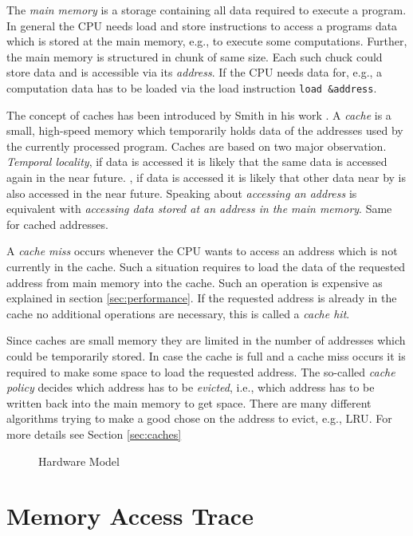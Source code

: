 \documentclass[onecolumn, openany, master, english, seal, signatures]{dbrgrptt}
\begin{document}
The \emph{main memory} is a storage containing all data required to execute a program. In general the CPU needs load and store instructions to access a programs data which is stored at the main memory, e.g., to execute some computations. Further, the main memory is structured in chunk of same size. Each such chuck could store data and is accessible via its \emph{address}. If the CPU needs data for, e.g., a computation data has to be loaded via the load instruction \texttt{load \&address}.

The concept of caches has been introduced by Smith in his work \cite{smith1982cache}. A \emph{cache} is a small, high-speed memory which temporarily holds data of the addresses used by the currently processed program. Caches are based on two major observation. \emph{Temporal locality}, if data is accessed it is likely that the same data is accessed again in the near future. , if data is accessed it is likely that other data near by is also accessed in the near future. Speaking about \emph{accessing an address} is equivalent with \emph{accessing data stored at an address in the main memory}. Same for cached addresses.

A \emph{cache miss} occurs whenever the CPU wants to access an address which is not currently in the cache. Such a situation requires to load the data of the requested address from main memory into the cache. Such an operation is expensive as explained in section \ref{sec:performance}. If the requested address is already in the cache no additional operations are necessary, this is called a \emph{cache hit}.

Since caches are small memory they are limited in the number of addresses which could be temporarily stored. In case the cache is full and a cache miss occurs it is required to make some space to load the requested address. The so-called \emph{cache policy} decides which address has to be \emph{evicted}, i.e., which address has to be written back into the main memory to get space. There are many different algorithms trying to make a good chose on the address to evict, e.g., \ac{LRU}. For more details see Section \ref{sec:caches}

\begin{figure}
  \centering
  
  \caption{Hardware Model}
  \label{fig:hard-ware-model}
\end{figure}

\section{Memory Access Trace}\label{sec:memory-access-trace}
\end{document}
